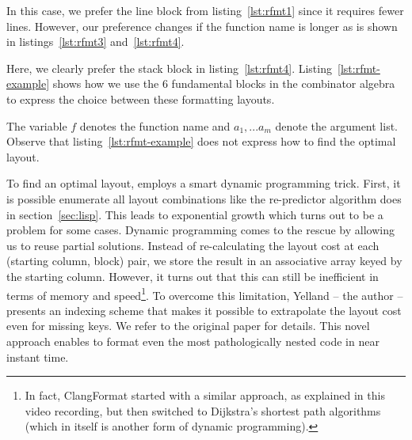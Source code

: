 In this case, we prefer the line block from listing~\ref{lst:rfmt1} since it requires fewer lines.
However, our preference changes if the function name is longer as is shown in listings~\ref{lst:rfmt3} and~\ref{lst:rfmt4}.

\begin{minipage}{.45\textwidth}
  
\end{minipage}
\hfil
\begin{minipage}{.45\textwidth}
  
\end{minipage}

Here, we clearly prefer the stack block in listing~\ref{lst:rfmt4}.
Listing~\ref{lst:rfmt-example} shows how we use the 6 fundamental blocks in the \rfmt{} combinator algebra to express the choice between these formatting layouts.

The variable $f$ denotes the function name and $a_1, ... a_m$ denote the argument list.
Observe that listing~\ref{lst:rfmt-example} does not express how to find the optimal layout.

To find an optimal layout, \rfmt{} employs a smart dynamic programming trick.
First, it is possible enumerate all layout combinations like the re-predictor algorithm does in section~\ref{sec:lisp}.
This leads to exponential growth which turns out to be a problem for some cases.
Dynamic programming comes to the rescue by allowing us to reuse partial solutions.
Instead of re-calculating the layout cost at each (starting column, block) pair, we store the result in an associative array keyed by the starting column.
However, it turns out that this can still be inefficient in terms of memory and speed\footnote{
  In fact, ClangFormat started with a similar approach, as explained in this\autocite{clang84:online} video recording, but then switched to Dijkstra's shortest path algorithms (which in itself is another form of dynamic programming).
}.
To overcome this limitation, Yelland -- the \rfmt{} author -- presents an indexing scheme that makes it possible to extrapolate the layout cost even for missing keys.
We refer to the original paper\autocite{yelland_new_2016} for details.
This novel approach enables \rfmt{} to format even the most pathologically nested code in near instant time.


